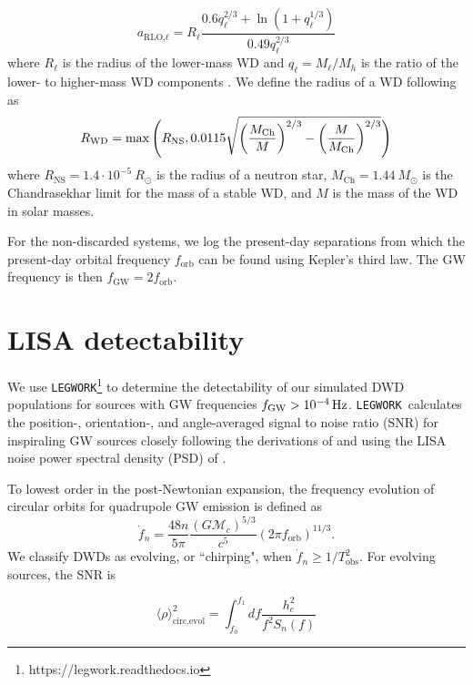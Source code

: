 \documentclass[twocolumn]{aastex631}
\newcommand{\legwork}{\texttt{LEGWORK}}
\begin{document}
\begin{equation}
    a_{\text{RLO,}\ell} = R_{\ell} \frac{0.6 q_{\ell}^{2/3} + \ln{(1+q_{\ell}^{1/3})}}{0.49 q_{\ell}^{2/3}}
\end{equation}
where $R_{\ell}$ is the radius of the lower-mass WD and $q_{\ell} = M_{\ell}/M_{h}$ is the ratio of the lower- to higher-mass WD components \citep{Eggleton1983}. 
We define the radius of a WD following \citet{Tout1997, Hurley2000} as
\begin{equation}
    R_{\rm{WD}} = \max\Bigg(R_\text{NS}, 0.0115\sqrt{\left(\frac{M_\text{Ch}}{M}\right)^{2/3}-\left(\frac{M}{M_\text{Ch}}\right)^{2/3}} \Bigg) 
\end{equation}
\noindent where $R_\text{NS} = 1.4\cdot 10^{-5}~R_\odot$ is the radius of a neutron star, $M_{\text{Ch}}=1.44 ~M_\odot$ is the Chandrasekhar limit for the mass of a stable WD, and $M$ is the mass of the WD in solar masses. 

For the non-discarded systems, we log the present-day separations from which the present-day orbital frequency $f_\text{orb}$ can be found using Kepler's third law. The GW frequency is then $f_\text{GW} = 2f_\text{orb}$.


\section{LISA detectability}
\label{sec:LISA_obs}
We use \legwork\footnote{https://legwork.readthedocs.io} \citep{Wagg2021} to determine the detectability of our simulated DWD populations for sources with GW frequencies $f_{\rm{GW}}>10^{-4}\,\rm{Hz}$. \legwork\ calculates the position-, orientation-, and angle-averaged signal to noise ratio (SNR) for inspiraling GW sources closely following the derivations of \citet{Flanagan1998} and using the LISA noise power spectral density (PSD) of \citet{Robson2019}. 

To lowest order in the post-Newtonian expansion, the frequency evolution of circular orbits for quadrupole GW emission is defined as
\begin{equation}
    \Dot{f}_n = \frac{48n}{5\pi} \frac{(G\mathcal{M}_c)^{5/3}}{c^5} (2\pi f_\text{orb})^{11/3}.
\end{equation}
We classify DWDs as evolving, or ``chirping", when $\Dot{f}_n \geq 1/T_\text{obs}^2$. For evolving sources, the SNR is

\begin{equation}
   \langle \rho \rangle^2_{\text{circ,evol}} = \int_{f_0}^{f_1}df   \frac{h_{c}^2}{f^2S_n(f)}
\end{equation}
\end{document}
